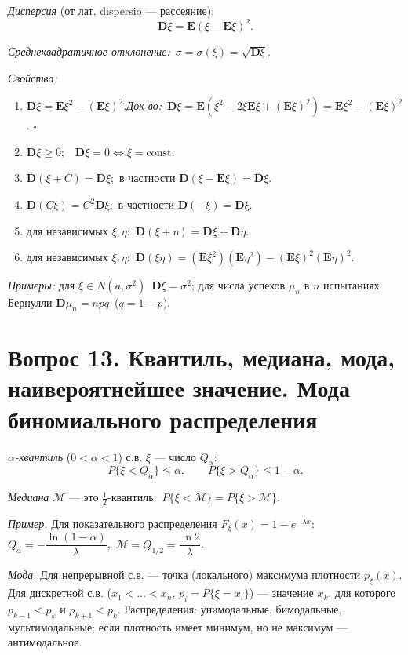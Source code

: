 \textit{Дисперсия} (от лат. dispersio — рассеяние):
\[ \mathbf{D}\xi=\mathbf{E}(\xi-\mathbf{E}\xi)^2. \]

\textit{Среднеквадратичное отклонение:}\ $\sigma=\sigma(\xi)=\sqrt{\mathbf{D}\xi}$.

\textit{Свойства:}
\begin{enumerate}
  \item $\mathbf{D}\xi=\mathbf{E}\xi^2-(\mathbf{E}\xi)^2$.\quad \textit{Док-во:}\ $\mathbf{D}\xi=\mathbf{E}(\xi^2-2\xi\mathbf{E}\xi+(\mathbf{E}\xi)^2)=\mathbf{E}\xi^2-(\mathbf{E}\xi)^2$. \hfill$\square$
  \item $\mathbf{D}\xi\ge0$;\ \ $\mathbf{D}\xi=0\Leftrightarrow\xi=\mathrm{const}$.
  \item $\mathbf{D}(\xi+C)=\mathbf{D}\xi$;\ в частности $\mathbf{D}(\xi-\mathbf{E}\xi)=\mathbf{D}\xi$.
  \item $\mathbf{D}(C\xi)=C^2\mathbf{D}\xi$;\ в частности $\mathbf{D}(-\xi)=\mathbf{D}\xi$.
  \item для независимых $\xi,\eta$:\ $\mathbf{D}(\xi+\eta)=\mathbf{D}\xi+\mathbf{D}\eta$.
  \item для независимых $\xi,\eta$:\ $\mathbf{D}(\xi\eta)=(\mathbf{E}\xi^2)(\mathbf{E}\eta^2)-(\mathbf{E}\xi)^2(\mathbf{E}\eta)^2$.
\end{enumerate}

\textit{Примеры:} для $\xi\in N(a,\sigma^2)$\ $\mathbf{D}\xi=\sigma^2$; для числа успехов $\mu_n$ в $n$ испытаниях Бернулли $\mathbf{D}\mu_n=npq$\ ($q=1-p$).

\section*{Вопрос 13. Квантиль, медиана, мода, наивероятнейшее значение. Мода биномиального распределения}

\textit{$\alpha$-квантиль} ($0<\alpha<1$) с.в. $\xi$ — число $Q_\alpha$:
\[ P\{\xi<Q_\alpha\}\le\alpha,\qquad P\{\xi>Q_\alpha\}\le1-\alpha. \]

\textit{Медиана} $\mathcal{M}$ — это $\tfrac12$-квантиль:\ $P\{\xi<\mathcal{M}\}=P\{\xi>\mathcal{M}\}$.

\textit{Пример.} Для показательного распределения $F_\xi(x)=1-e^{-\lambda x}$:\ $Q_\alpha=-\dfrac{\ln(1-\alpha)}{\lambda}$,\ $\mathcal{M}=Q_{1/2}=\dfrac{\ln2}{\lambda}$.

\textit{Мода.} Для непрерывной с.в. — точка (локального) максимума плотности $p_\xi(x)$. Для дискретной с.в. ($x_1<\dots<x_n$, $p_i=P\{\xi=x_i\}$) — значение $x_k$, для которого $p_{k-1}<p_k$ и $p_{k+1}<p_k$. Распределения: унимодальные, бимодальные, мультимодальные; если плотность имеет минимум, но не максимум — антимодальное.

